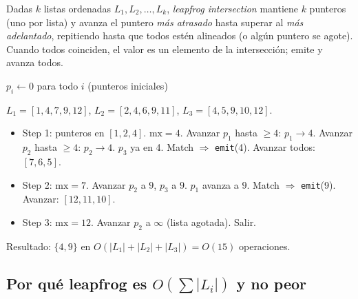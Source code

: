 \begin{definition}
Dadas \(k\) listas ordenadas \(L_1, L_2, \dots, L_k\), \emph{leapfrog
intersection} mantiene \(k\) punteros (uno por lista) y avanza el
puntero \emph{más atrasado} hasta superar al \emph{más adelantado},
repitiendo hasta que todos estén alineados (o algún puntero se
agote). Cuando todos coinciden, el valor es un elemento de la
intersección; emite y avanza todos.
\end{definition}

\begin{algorithm}[H]
\caption{Leapfrog intersection sobre \(k\) listas ordenadas}
\(p_i \leftarrow 0\) para todo \(i\) (punteros iniciales)\;
\end{algorithm}

\begin{ejemplo}
\(L_1 = [1, 4, 7, 9, 12]\), \(L_2 = [2, 4, 6, 9, 11]\),
\(L_3 = [4, 5, 9, 10, 12]\).

\begin{itemize}
    \item Step 1: punteros en \([1, 2, 4]\). \(\mathrm{mx} = 4\).
    Avanzar \(p_1\) hasta \(\geq 4\): \(p_1 \to 4\). Avanzar \(p_2\)
    hasta \(\geq 4\): \(p_2 \to 4\). \(p_3\) ya en 4. Match
    $\Rightarrow$ \texttt{emit}(4). Avanzar todos: \([7, 6, 5]\).
    \item Step 2: \(\mathrm{mx} = 7\). Avanzar \(p_2\) a \(9\),
    \(p_3\) a \(9\). \(p_1\) avanza a \(9\). Match $\Rightarrow$
    \texttt{emit}(9). Avanzar: \([12, 11, 10]\).
    \item Step 3: \(\mathrm{mx} = 12\). Avanzar \(p_2\) a $\infty$
    (lista agotada). Salir.
\end{itemize}

\noindent
Resultado: \(\{4, 9\}\) en \(O(|L_1| + |L_2| + |L_3|) =
O(15)\) operaciones.
\end{ejemplo}

\subsection{Por qué leapfrog es \(O(\sum |L_i|)\) y no peor}

